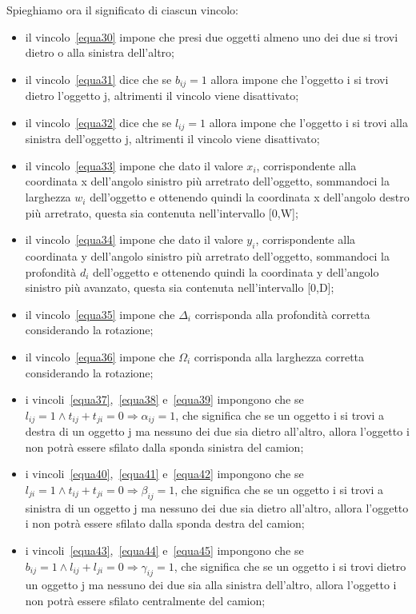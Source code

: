 \newpage
Spieghiamo ora il significato di ciascun vincolo:
\begin{itemize}
	\item il vincolo~\eqref{equa30} impone che presi due oggetti almeno uno dei due si trovi dietro o alla sinistra dell'altro;
	\item il vincolo~\eqref{equa31} dice che se $b_{ij} = 1$ allora impone che l'oggetto i si trovi dietro l'oggetto j, altrimenti il vincolo viene disattivato;
	\item il vincolo~\eqref{equa32} dice che se $l_{ij} = 1$ allora impone che l'oggetto i si trovi alla sinistra dell'oggetto j, altrimenti il vincolo viene disattivato;
	\item il vincolo~\eqref{equa33} impone che dato il valore $x_i$, corrispondente alla coordinata x dell'angolo sinistro più arretrato dell'oggetto, sommandoci la larghezza $w_i$ dell'oggetto e ottenendo quindi la coordinata x dell'angolo destro più arretrato, questa sia contenuta nell'intervallo [0,W];
	\item il vincolo~\eqref{equa34} impone che dato il valore $y_i$, corrispondente alla coordinata y dell'angolo sinistro più arretrato dell'oggetto, sommandoci la profondità $d_i$ dell'oggetto e ottenendo quindi la coordinata y dell'angolo sinistro più avanzato, questa sia contenuta nell'intervallo [0,D];
	\item il vincolo~\eqref{equa35} impone che $\Delta_i$ corrisponda alla profondità corretta considerando la rotazione;
	\item il vincolo~\eqref{equa36} impone che $\Omega_i$ corrisponda alla larghezza corretta considerando la rotazione;
	\item i vincoli~\eqref{equa37},~\eqref{equa38} e~\eqref{equa39} impongono che se $l_{ij} = 1 \land t_{ij} + t_{ji} = 0 \Rightarrow \alpha_{ij} = 1$, che significa che se un oggetto i si trovi a destra di un oggetto j ma nessuno dei due sia dietro all'altro, allora l'oggetto i non potrà essere sfilato dalla sponda sinistra del camion;
	\item i vincoli~\eqref{equa40},~\eqref{equa41} e~\eqref{equa42} impongono che se $l_{ji} = 1 \land t_{ij} + t_{ji} = 0 \Rightarrow \beta_{ij} = 1$, che significa che se un oggetto i si trovi a sinistra di un oggetto j ma nessuno dei due sia dietro all'altro, allora l'oggetto i non potrà essere sfilato dalla sponda destra del camion;
	\item i vincoli~\eqref{equa43},~\eqref{equa44} e~\eqref{equa45} impongono che se $b_{ij} = 1 \land l_{ij} + l_{ji} = 0 \Rightarrow \gamma_{ij} = 1$, che significa che se un oggetto i si trovi dietro un oggetto j ma nessuno dei due sia alla sinistra dell'altro, allora l'oggetto i non potrà essere sfilato centralmente del camion;

\end{itemize}
